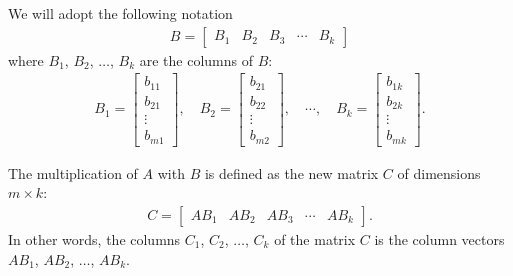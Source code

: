 \documentclass[12pt,a4paper]{article}
\begin{document}
	\noindent We will adopt the following notation
		\begin{align*}
		B = \begin{bmatrix}
		B_1 & B_2 & B_3 & \cdots & B_k
		\end{bmatrix}
		\end{align*}
	where $B_1$, $B_2$, $\ldots$, $B_k$ are the columns of $B$:
		\begin{align*}
		B_1 = \begin{bmatrix}
		b_{11} \\ b_{21} \\ \vdots \\ b_{m1}
		\end{bmatrix} , \quad
		B_2 = \begin{bmatrix}
		b_{21} \\ b_{22} \\ \vdots \\ b_{m2}
		\end{bmatrix} , \quad \cdots , \quad
		B_k = \begin{bmatrix}
		b_{1k} \\ b_{2k} \\ \vdots \\ b_{mk}
		\end{bmatrix} .
		\end{align*}
	
	
	\vspace*{16pt}
	
	\noindent The multiplication of $A$ with $B$ is defined as the new matrix $C$ of dimensions $m \times k$:
		\begin{align*}
		C = \begin{bmatrix}
		A B_1 & A B_2 & A B_3 & \cdots & A B_k
		\end{bmatrix} .
		\end{align*}
	In other words, the columns $C_1$, $C_2$, $\ldots$, $C_k$ of the matrix $C$ is the column vectors $AB_1$, $AB_2$, $\ldots$, $AB_k$.
	
	\vspace*{16pt}
	
\end{document}
